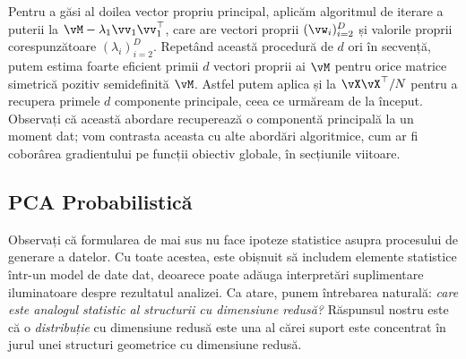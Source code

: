 \documentclass[../../book-main_ro.tex]{subfiles}
\begin{document}
Pentru a găsi al doilea vector propriu principal, aplicăm algoritmul de iterare a puterii la \(\vM - \lambda_{1}\vv_{1}\vv_{1}^{\top}\), care are vectori proprii \((\vw_{i})_{i = 2}^{D}\) și valorile proprii corespunzătoare \((\lambda_{i})_{i = 2}^{D}\). Repetând această procedură de \(d\) ori în secvență, putem estima foarte eficient primii \(d\) vectori proprii ai \(\vM\) pentru orice matrice simetrică pozitiv semidefinită \(\vM\). Astfel putem aplica și la \(\vX\vX^{\top}/N\) pentru a recupera primele \(d\) componente principale, ceea ce urmăream de la început. Observați că această abordare recuperează o componentă principală la un moment dat; vom contrasta aceasta cu alte abordări algoritmice, cum ar fi coborârea gradientului pe funcții obiectiv globale, în secțiunile viitoare.




\subsection{PCA Probabilistică}\label{subsec:probabilistic PCA}

Observați că formularea de mai sus nu face ipoteze statistice asupra
procesului de generare a datelor. Cu toate acestea, este obișnuit să includem elemente statistice
într-un model de date dat, deoarece poate adăuga interpretări suplimentare iluminatoare
despre rezultatul analizei. Ca atare, punem întrebarea naturală:
\textit{care este analogul statistic al structurii cu dimensiune redusă?} Răspunsul nostru este că o \textit{distribuție} cu dimensiune redusă este una al cărei suport este concentrat în jurul unei structuri geometrice cu dimensiune redusă.
\end{document}

